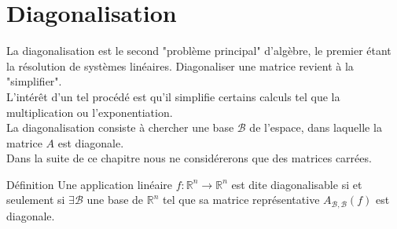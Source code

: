 \chapter{Diagonalisation}
  La diagonalisation est le second "problème principal" d'algèbre, le premier étant la résolution de systèmes
  linéaires.
Diagonaliser une matrice revient à la "simplifier".\\
L'intérêt d'un tel procédé est qu'il simplifie certains calculs tel que la multiplication ou l'exponentiation.\\
La diagonalisation consiste à chercher une base $\mathscr{B}$ de l'espace, dans laquelle la matrice $A$ est diagonale.\\
Dans la suite de ce chapitre nous ne considérerons que des matrices carrées.\\
\begin{bclogo}[couleur=blue!30,couleurBord=blue,arrondi=0.1,logo=\bcbook,ombre=true]{Définition}
Une application linéaire $f:\mathbb{R}^{n}\rightarrow\mathbb{R}^{n}$  est dite diagonalisable si et seulement si $\exists \mathscr{B}$ une base de $\mathbb{R}^{n}$ tel que sa matrice représentative $A_{\mathscr{B},\mathscr{B}}(f)$ est diagonale.
\end{bclogo}
